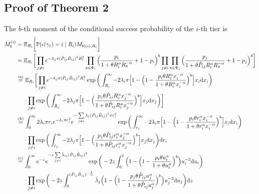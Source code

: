\documentclass[12pt,draftclsnofoot,journal,onecolumn]{IEEEtran}
\def\E{\mathbb{E}}
\def\P{\mathbb{P}}
\def\dd{\mathrm{d}}
\def\eqa{\stackrel{{\rm (a)}}{=}}
\def\eqb{\stackrel{{\rm (b)}}{=}}
\def\eqc{\stackrel{{\rm (c)}}{=}}
\begin{document}
\subsection{Proof of Theorem 2} 
\begin{IEEEproof}
	The $b$-th moment of the conditional success probability of the $i$-th tier is 
	\begin{align}\label{eq:Mb_typ_ith2}
	M_b^{(i)} &= \E_{R_i}\bigg[\P(\iota(\gamma_1)=i \mid R_i) M_{b\mid (i),R_i}\bigg] \nonumber \\
	&= \E_{R_i}\bigg[\prod\limits_{j\neq i}e^{-\lambda_j\pi (\hat P_{ij} \hat B_{ij})^{\delta} R_i^2}  \prod_{{\rm x} \in \Phi_i} \Big(\frac{p_i}{1+\theta R_i^{\alpha}R_{{\rm x}}^{-\alpha}}+1-p_i\Big)^b \prod_{j\neq i}\prod_{{\rm x} \in\Phi_j}\Big(\frac{p_j}{1+\theta {\hat P_{ij}} R_i^{\alpha} R_{{\rm x}}^{-\alpha}}+1-p_j\Big)^b  \bigg] \nonumber \\
	&\eqa \E_{R_i}\bigg[\prod\limits_{j\neq i}e^{-\lambda_j\pi (\hat P_{ij} \hat B_{ij})^{\delta} R_i^2} \exp\bigg(\int_{R_i}^\infty -2\lambda_i\pi\Big[1- \Big(1-\frac{p_i\theta R_i^\alpha x_i^{-\alpha}}{1+\theta R_i^\alpha x_i^{-\alpha}}\Big)^b \Big]x_i\dd x_i \bigg) \nonumber\\
	&~~~~\cdot \prod\limits_{j\neq i} \exp\bigg(\int_{\hat R_j}^\infty -2\lambda_j\pi\Big[1- \Big(\frac{p_j\theta\hat P_{ij}R_i^\alpha x_j^{-\alpha}}{1+\theta \hat P_{ij} R_i^\alpha x_j^{-\alpha}}\Big)^b \Big]x_j\dd x_j \bigg)  \bigg] \nonumber \\
	&\eqb \int_0^\infty 2\lambda_i \pi r_i e^{-\lambda_i \pi r_i^2} e^{-\sum\limits_{j\neq i}\lambda_j (\hat P_{ij} \hat B_{ij})^{\delta}\pi r_i^2}  \exp\bigg(\int_{r_i}^\infty -2\lambda_i\pi\Big[1- \Big(1-\frac{p_i\theta r_i^\alpha x_i^{-\alpha}}{1+\theta r_i^\alpha x_i^{-\alpha}}\Big)^b \Big]x_i\dd x_i \bigg) \nonumber\\
	&~~~~\cdot \prod\limits_{j\neq i} \exp\bigg(\int_{\hat r_j}^\infty -2\lambda_j\pi\Big[1- \Big(\frac{p_j\theta\hat P_{ij}r_i^\alpha x_j^{-\alpha}}{1+\theta \hat P_{ij} r_i^\alpha x_j^{-\alpha}}\Big)^b \Big]x_j\dd x_j \bigg) \dd r_i \nonumber \\
	&\eqc \int_0^\infty e^{-z} e^{-z\sum\limits_{j\neq i}\hat\lambda_{ij} (\hat P_{ij} \hat B_{ij})^{\delta}} \exp\bigg(-2z \int_0^1\Big(1-\Big(1-\frac{p_i \theta u_i^\alpha}{1+\theta u_i^\alpha}\Big)^b \Big)u_i^{-3}\dd u_i \bigg) \nonumber \\
	&~~~~\cdot \prod\limits_{j\neq i} \exp\bigg(-2z \int_0^{(\hat P_{ij} \hat B_{ij})^{-\frac{1}{\alpha}}} \hat\lambda_j \Big(1- \Big(1-\frac{p_j\theta\hat P_{ij}u_j^\alpha}{1+\theta \hat P_{ij} u_j^\alpha}\Big)^b \Big)u_j^{-3}\dd u_j \bigg) \dd z \nonumber \\

\end{align}
\end{IEEEproof}
\end{document}
